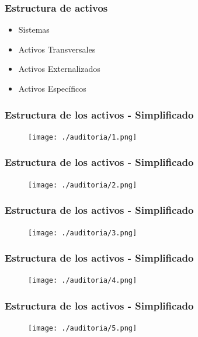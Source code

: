 \documentclass{beamer}
\begin{document}
\begin{frame}[c,fragile]
	\frametitle{Estructura de activos}
	\begin{itemize}
		\item{Sistemas}
		\item{Activos Transversales}
		\item{Activos Externalizados}
		\item{Activos Específicos}
	\end{itemize}
\end{frame}

\begin{frame}[c,fragile]
	\frametitle{Estructura de los activos - Simplificado}
	\begin{figure}[H]
		\centering
		\texttt{[image: ./auditoria/1.png]}\\
	\end{figure}
\end{frame}

\begin{frame}[c,fragile]
	\frametitle{Estructura de los activos - Simplificado}
	\begin{figure}[H]
		\centering
		\texttt{[image: ./auditoria/2.png]}\\
	\end{figure}
\end{frame}

\begin{frame}[c,fragile]
	\frametitle{Estructura de los activos - Simplificado}
	\begin{figure}[H]
		\centering
		\texttt{[image: ./auditoria/3.png]}\\
	\end{figure}
\end{frame}

\begin{frame}[c,fragile]
	\frametitle{Estructura de los activos - Simplificado}
	\begin{figure}[H]
		\centering
		\texttt{[image: ./auditoria/4.png]}\\
	\end{figure}
\end{frame}

\begin{frame}[c,fragile]
	\frametitle{Estructura de los activos - Simplificado}
	\begin{figure}[H]
		\centering
		\texttt{[image: ./auditoria/5.png]}\\
	\end{figure}
\end{frame}
\end{document}
